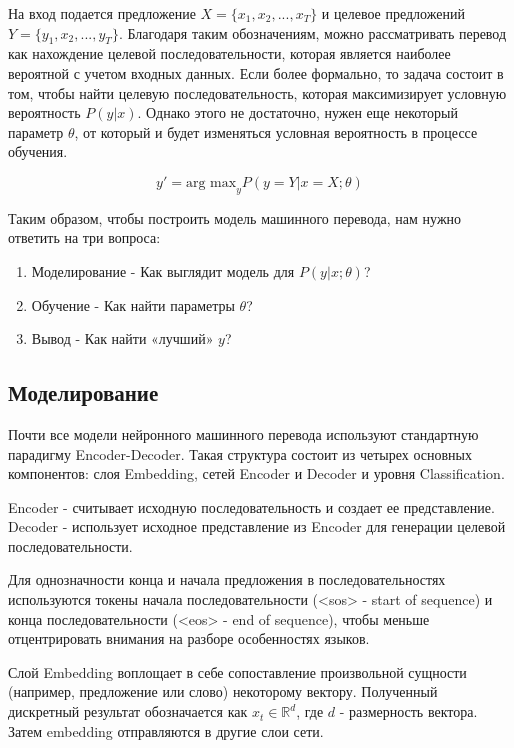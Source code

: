     На вход подается предложение $X = \{x_1, x_2, ... , x_T\}$ и целевое предложений $Y = \{y_1, x_2, ... , y_T\}$. Благодаря таким обозначениям, можно рассматривать перевод как нахождение целевой последовательности, которая является наиболее вероятной с учетом входных данных. Если более формально, то задача состоит в том, чтобы найти целевую последовательность, которая максимизирует условную вероятность $P(y|x)$. Однако этого не достаточно, нужен еще некоторый параметр $\theta$, от который и будет изменяться условная вероятность в процессе обучения. 
    
    $$
        y' = \text{arg max}_y P(y = Y | x = X; \theta)
    $$
    
    Таким образом, чтобы построить модель машинного перевода, нам нужно ответить на три вопроса:
    
    \begin{enumerate}
        \item Моделирование - Как выглядит модель для $P(y|x; \theta)$?
        \item Обучение - Как найти параметры $\theta$?
        \item Вывод - Как найти «лучший» $y$?
    \end{enumerate}
    
    \subsection{Моделирование}

        Почти все модели нейронного машинного перевода используют стандартную парадигму Encoder-Decoder. Такая структура состоит из четырех основных компонентов: слоя Embedding, сетей Encoder и Decoder и уровня Classification.
    
    Encoder - считывает исходную последовательность и создает ее представление. Decoder - использует исходное представление из Encoder для генерации целевой последовательности.
    
    Для однозначности конца и начала предложения в последовательностях используются токены начала последовательности (<sos> - start of sequence) и конца последовательности (<eos> - end of sequence), чтобы меньше отцентрировать внимания на разборе особенностях языков.
	
	Слой Embedding воплощает в себе сопоставление произвольной сущности (например, предложение или слово) некоторому вектору. Полученный дискретный результат обозначается как $x_t \in \mathbb{R}^d$, где $d$ - размерность вектора. Затем embedding отправляются в другие слои сети.
	
